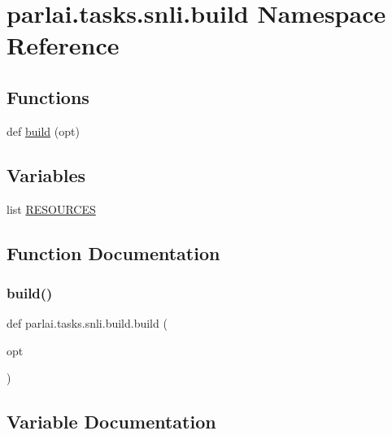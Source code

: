 \hypertarget{namespaceparlai_1_1tasks_1_1snli_1_1build}{}\section{parlai.\+tasks.\+snli.\+build Namespace Reference}
\label{namespaceparlai_1_1tasks_1_1snli_1_1build}
\subsection*{Functions}
\begin{DoxyCompactItemize}
\item 
def \hyperlink{namespaceparlai_1_1tasks_1_1snli_1_1build_a525584627ce716e22d77dd663be2c2ba}{build} (opt)
\end{DoxyCompactItemize}
\subsection*{Variables}
\begin{DoxyCompactItemize}
\item 
list \hyperlink{namespaceparlai_1_1tasks_1_1snli_1_1build_afdf500f9b1d4bb1209dd7d07be5f01dc}{R\+E\+S\+O\+U\+R\+C\+ES}
\end{DoxyCompactItemize}


\subsection{Function Documentation}
\mbox{\label{namespaceparlai_1_1tasks_1_1snli_1_1build_a525584627ce716e22d77dd663be2c2ba}} 
\subsubsection{\texorpdfstring{build()}{build()}}
{\footnotesize\ttfamily def parlai.\+tasks.\+snli.\+build.\+build (\begin{DoxyParamCaption}\item[{}]{opt }\end{DoxyParamCaption})}



\subsection{Variable Documentation}
\mbox{\label{namespaceparlai_1_1tasks_1_1snli_1_1build_afdf500f9b1d4bb1209dd7d07be5f01dc}} 
